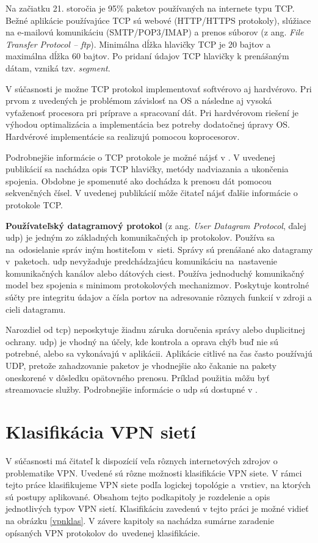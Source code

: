 Na začiatku 21. storočia je 95\% paketov používaných na internete typu TCP. Bežné aplikácie používajúce TCP sú webové (HTTP/HTTPS protokoly), slúžiace na e-mailovú komunikáciu (SMTP/POP3/IMAP) a prenos súborov (z ang. \textit{File Transfer Protocol -- \acrshort{ftp}}). Minimálna dĺžka hlavičky TCP je 20 bajtov a maximálna dĺžka 60 bajtov. Po pridaní údajov TCP hlavičky k prenášaným dátam, vzniká tzv. \textit{segment}.

V súčasnosti je možne TCP protokol implementovať softvérovo aj hardvérovo. Pri prvom z uvedených je problémom závislosť na OS a následne aj vysoká vyťaženosť procesora pri príprave a spracovaní dát. Pri hardvérovom riešení je výhodou optimalizácia a implementácia bez potreby dodatočnej úpravy OS. Hardvérové implementácie sa realizujú pomocou koprocesorov.

Podrobnejšie informácie o TCP protokole je možné nájsť v \cite{tcp2}. V uvedenej publikácií sa nachádza opis TCP hlavičky, metódy nadviazania a ukončenia spojenia. Obdobne je spomenuté ako dochádza k prenosu dát pomocou sekvenčných čísel. V uvedenej publikácií môže čitateľ nájsť ďalšie informácie o protokole TCP.

\textbf{Používateľský datagramový protokol} (z ang. \textit{User Datagram Protocol}, ďalej \acrshort{udp}) je jedným zo základných komunikačných \acrshort{ip} protokolov. Používa sa na~odosielanie správ iným hostiteľom v~sieti. Správy sú prenášané ako datagramy v~paketoch. \acrshort{udp} nevyžaduje predchádzajúcu komunikáciu na~nastavenie komunikačných kanálov alebo dátových ciest. Používa jednoduchý komunikačný model bez spojenia s minimom protokolových mechanizmov. Poskytuje kontrolné súčty pre integritu údajov a čísla portov na adresovanie rôznych funkcií v zdroji a cieli datagramu. 

Narozdiel od \acrshort{tcp}) neposkytuje žiadnu záruka doručenia správy alebo duplicitnej ochrany. 
\acrshort{udp}) je vhodný na účely, kde kontrola a oprava chýb buď nie sú potrebné, alebo sa vykonávajú v aplikácii. Aplikácie citlivé na čas často používajú UDP, pretože zahadzovanie paketov je vhodnejšie ako čakanie na pakety oneskorené v dôsledku opätovného prenosu. Príklad použitia môžu byť streamovacie služby. 
Podrobnejšie informácie o \acrshort{udp} sú dostupné v \cite{udp}.

\section{Klasifikácia VPN sietí}
V súčasnosti má čitateľ k dispozícií veľa rôznych internetových zdrojov o problematike VPN. Uvedené sú rôzne možnosti klasifikácie VPN siete. V rámci tejto práce klasifikujeme VPN siete podľa logickej topológie a~vrstiev, na ktorých sú postupy aplikované. Obsahom tejto podkapitoly je rozdelenie a opis jednotlivých typov VPN sietí. Klasifikáciu zavedenú v tejto práci je možné vidieť na obrázku \ref{vpnklas}. V závere kapitoly sa nachádza sumárne zaradenie opísaných VPN protokolov do~uvedenej klasifikácie.

